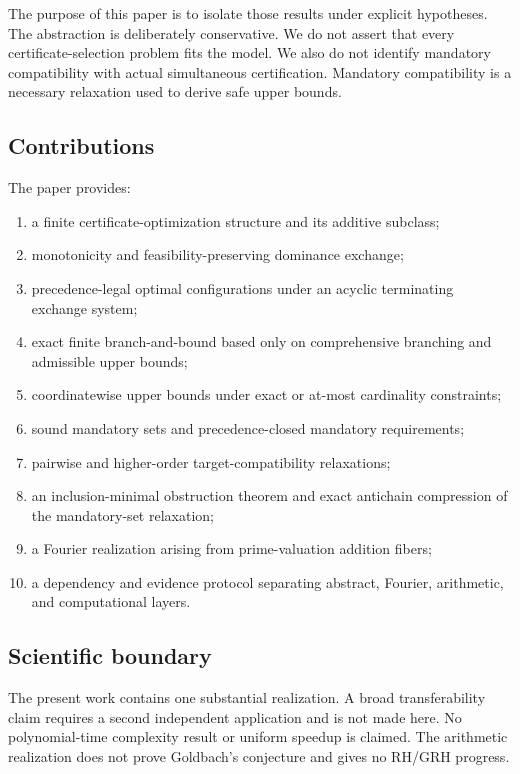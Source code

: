 \documentclass[11pt]{article}
\theoremstyle{definition}
\theoremstyle{remark}
\begin{document}
The purpose of this paper is to isolate those results under explicit hypotheses. The abstraction is deliberately conservative. We do not assert that every certificate-selection problem fits the model. We also do not identify mandatory compatibility with actual simultaneous certification. Mandatory compatibility is a necessary relaxation used to derive safe upper bounds.

\subsection{Contributions}

The paper provides:
\begin{enumerate}[label=(\arabic*)]
\item a finite certificate-optimization structure and its additive subclass;
\item monotonicity and feasibility-preserving dominance exchange;
\item precedence-legal optimal configurations under an acyclic terminating exchange system;
\item exact finite branch-and-bound based only on comprehensive branching and admissible upper bounds;
\item coordinatewise upper bounds under exact or at-most cardinality constraints;
\item sound mandatory sets and precedence-closed mandatory requirements;
\item pairwise and higher-order target-compatibility relaxations;
\item an inclusion-minimal obstruction theorem and exact antichain compression of the mandatory-set relaxation;
\item a Fourier realization arising from prime-valuation addition fibers;
\item a dependency and evidence protocol separating abstract, Fourier, arithmetic, and computational layers.
\end{enumerate}

\subsection{Scientific boundary}

The present work contains one substantial realization. A broad transferability claim requires a second independent application and is not made here. No polynomial-time complexity result or uniform speedup is claimed. The arithmetic realization does not prove Goldbach's conjecture and gives no RH/GRH progress.
\end{document}
